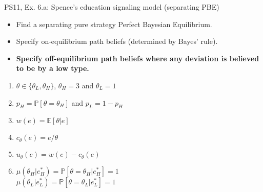 \begin{frame}{PS11, Ex. 6.a: Spence’s education signaling model (separating PBE)}
    \begin{itemize}
      \item[(a)] Find a separating pure strategy Perfect Bayesian Equilibrium.
    \end{itemize}\vspace{-8pt}
    \begin{multicols}{2}
      \begin{itemize}
        \item[Step 1:] Specify on-equilibrium path beliefs (determined by Bayes' rule).
        \item[Step 2:] \textbf{Specify off-equilibrium path beliefs where any deviation is believed to be by a low type.}
      \end{itemize}
      \vfill\null\columnbreak
      \begin{enumerate}
        \item[Types:] $\theta\in\{\theta_L,\theta_H\}$, $\theta_H=3$ and $\theta_L=1$
        \item[Prob.:] $p_H=\mathbb{P}[\theta=\theta_H]$ and $p_L=1-p_H$
        \item[Wage:] $w(e)=\mathbb{E}[\theta|e]$
        \item[Cost:] $c_\theta(e)=e/\theta$
        \item[Utility:] $u_\theta(e)=w(e)-c_\theta(e)$
        \item $\mu\left(\theta_H|e_H^*\right)=
               \mathbb{P}\left[\theta=\theta_H|e_H^*\right]=1$\\
              $\mu\left(\theta_L|e_L^*\right)=
               \mathbb{P}\left[\theta=\theta_L|e_L^*\right]=1$
      \end{enumerate}
    \end{multicols}
    \vfill\null
\end{frame}
